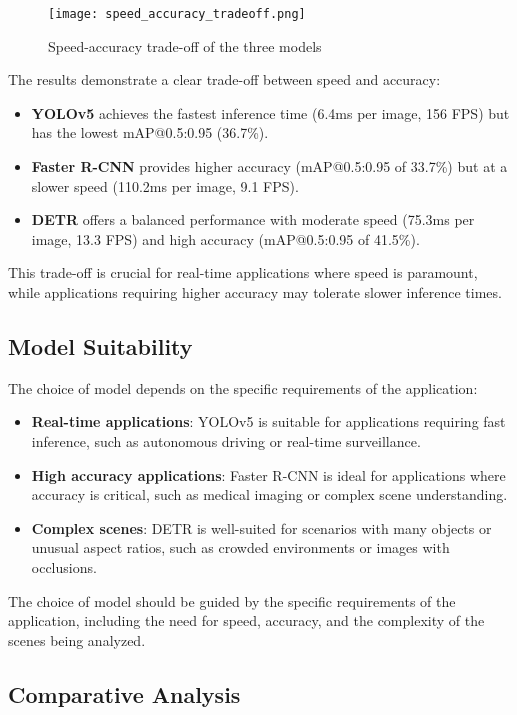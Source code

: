 \documentclass[12pt,a4paper]{article}
\begin{document}
\begin{figure}[H]
    \centering
    \texttt{[image: speed\_accuracy\_tradeoff.png]}
    \caption{Speed-accuracy trade-off of the three models}
    \label{fig:speed_accuracy}
\end{figure}

The results demonstrate a clear trade-off between speed and accuracy:

\begin{itemize}
    \item \textbf{YOLOv5} achieves the fastest inference time (6.4ms per image, 156 FPS) but has the lowest mAP@0.5:0.95 (36.7\%).
    \item \textbf{Faster R-CNN} provides higher accuracy (mAP@0.5:0.95 of 33.7\%) but at a slower speed (110.2ms per image, 9.1 FPS).
    \item \textbf{DETR} offers a balanced performance with moderate speed (75.3ms per image, 13.3 FPS) and high accuracy (mAP@0.5:0.95 of 41.5\%).
\end{itemize}
This trade-off is crucial for real-time applications where speed is paramount, while applications requiring higher accuracy may tolerate slower inference times.
\subsection{Model Suitability}
The choice of model depends on the specific requirements of the application:
\begin{itemize}
    \item \textbf{Real-time applications}: YOLOv5 is suitable for applications requiring fast inference, such as autonomous driving or real-time surveillance.
    \item \textbf{High accuracy applications}: Faster R-CNN is ideal for applications where accuracy is critical, such as medical imaging or complex scene understanding.
    \item \textbf{Complex scenes}: DETR is well-suited for scenarios with many objects or unusual aspect ratios, such as crowded environments or images with occlusions.
\end{itemize}
The choice of model should be guided by the specific requirements of the application, including the need for speed, accuracy, and the complexity of the scenes being analyzed.


\subsection{Comparative Analysis}
\end{document}
